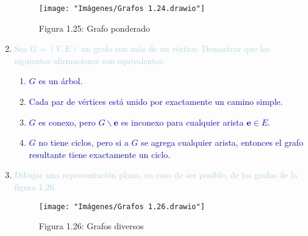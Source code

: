 \documentclass[12pt]{article}
\newcommand{\lb}[1]{\textcolor{lightblue}{#1}}
\newcommand{\db}[1]{\textcolor{blue}{#1}}
\begin{document}
\begin{enumerate}[label=\color{red}\textbf{\arabic*)},leftmargin=*]
	\begin{figure}[h]
		\centering
		\texttt{[image: "Imágenes/Grafos 1.24.drawio"]}
		\caption*{Figura 1.25: Grafo ponderado}
	\end{figure}
	\item \lb{Sea $G=(V,E)$ un grafo con más de un vértice. Demostrar que las siguientes afirmaciones son equivalentes.}
	\begin{enumerate}[label=\color{red}\alph*)]
		\item \db{$G$ es un árbol.}
		\item \db{Cada par de vértices está unido por exactamente un camino simple.}
		\item \db{$G$ es conexo, pero $G\backslash\mathbf{e}$ es inconexo para cualquier arista $\mathbf{e}\in E$.}
		\item \db{$G$ no tiene ciclos, pero si a $G$ se agrega cualquier arista, entonces el grafo resultante tiene exactamente un ciclo.}
	\end{enumerate}
	\item \lb{Dibujar una representación plana, en caso de ser posible, de los grafos de la figura 1.26.}
	
	\begin{figure}[h]
		\centering
		\texttt{[image: "Imágenes/Grafos 1.26.drawio"]}
		\caption*{Figura 1.26: Grafos diversos}
	\end{figure}
	

\end{enumerate}
\end{document}
